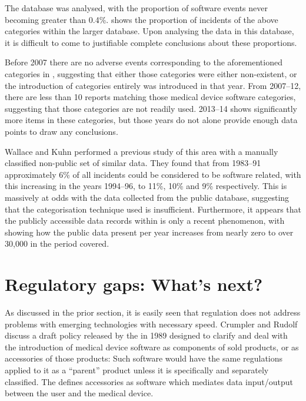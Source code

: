 \documentclass{cshonours}
\begin{document}
The database was analysed, with the proportion of software events never becoming greater than 0.4\%.  shows the proportion of incidents of the above categories within the larger database. Upon analysing the data in this database, it is difficult to come to justifiable complete conclusions about these proportions.

Before 2007 there are no adverse events corresponding to the aforementioned categories in \maude, suggesting that either those categories were either non-existent, or the introduction of categories entirely was introduced in that year. From 2007--12, there are less than 10 reports matching those medical device software categories, suggesting that those categories are not readily used. 2013--14 shows significantly more items in these categories, but those years do not alone provide enough data points to draw any conclusions.

Wallace and Kuhn \cite{wallace2001failure} performed a previous study of this area with a manually classified non-public set of similar \fda data. They found that from 1983--91 approximately 6\% of all incidents could be considered to be software related, with this increasing in the years 1994--96, to 11\%, 10\% and 9\% respectively. This is massively at odds with the data collected from the public \maude database, suggesting that the categorisation technique used is insufficient. Furthermore, it appears that the publicly accessible data records within \maude is only a recent phenomenon, with  showing how the public data present per year increases from nearly zero to over 30,000 in the period covered.




\chapter{Regulatory gaps: What's next?}
\label{chap:reggaps}
As discussed in the prior section, it is easily seen that regulation does not address problems with emerging technologies with necessary speed. Crumpler and Rudolf \cite{crumpler1997fda} discuss a draft policy released by the \fda in 1989 designed to clarify and deal with the introduction of medical device software as components of sold products, or as accessories of those products: Such software would have the same regulations applied to it as a ``parent'' product unless it is specifically and separately classified. The \fda defines accessories as software which mediates data input/output between the user and the medical device.
\end{document}
